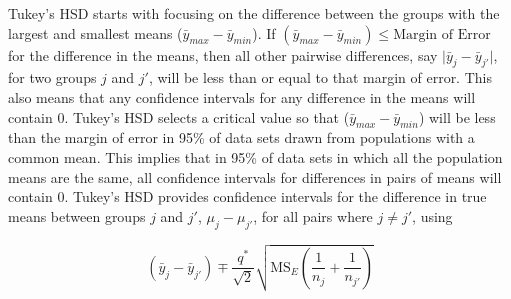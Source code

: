 \documentclass[]{book}
\theoremstyle{definition}
\theoremstyle{definition}
\theoremstyle{remark}
\begin{document}
Tukey's HSD starts with focusing on the difference between the groups
with the largest and smallest means (\(\bar{y}_{max}-\bar{y}_{min}\)).
If \((\bar{y}_{max}-\bar{y}_{min}) \le \text{Margin of Error}\) for the
difference in the means, then all other pairwise differences, say
\(\vert \bar{y}_j - \bar{y}_{j'}\vert\), for two groups \(j\) and
\(j'\), will be less than or equal to that margin of error. This also
means that any confidence intervals for any difference in the means will
contain 0. Tukey's HSD selects a critical value so that
(\(\bar{y}_{max}-\bar{y}_{min}\)) will be less than the margin of error
in 95\% of data sets drawn from populations with a common mean. This
implies that in 95\% of data sets in which all the population means are
the same, all confidence intervals for differences in pairs of means
will contain 0. Tukey's HSD provides confidence intervals for the
difference in true means between groups \(j\) and \(j'\),
\(\mu_j-\mu_{j'}\), for all pairs where \(j \ne j'\), using

\[(\bar{y}_j - \bar{y}_{j'}) \mp \frac{q^*}{\sqrt{2}}\sqrt{\text{MS}_E\left(\frac{1}{n_j}+
\frac{1}{n_{j'}}\right)}\]
\end{document}
